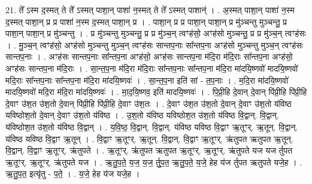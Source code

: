 \documentclass[17pt]{extarticle}
\begin{document}
21. ते᳚ ऽस्म द॒स्मत् ते ते᳚ ऽस्मत् पाशा॒न् पाशा॑ न॒स्मत् ते ते᳚ ऽस्मत् पाशान्॑ । . अ॒स्मत् पाशा॒न् पाशा॑ न॒स्म द॒स्मत् पाशा॒न् प्र प्र पाशा॑ न॒स्म द॒स्मत् पाशा॒न् प्र । . पाशा॒न् प्र प्र पाशा॒न् पाशा॒न् प्र मु॑ञ्चन्तु मुञ्चन्तु॒ प्र पाशा॒न् पाशा॒न् प्र मु॑ञ्चन्तु । . प्र मु॑ञ्चन्तु मुञ्चन्तु॒ प्र प्र मु॑ञ्च॒न् त्वꣳह॑सो॒ अꣳह॑सो मुञ्चन्तु॒ प्र प्र मु॑ञ्च॒न् त्वꣳह॑सः । . मु॒ञ्च॒न् त्वꣳह॑सो॒ अꣳह॑सो मुञ्चन्तु मुञ्च॒न् त्वꣳह॑सः सान्तप॒नाः सा᳚न्तप॒ना अꣳह॑सो मुञ्चन्तु मुञ्च॒न् त्वꣳह॑सः सान्तप॒नाः । . अꣳह॑सः सान्तप॒नाः सा᳚न्तप॒ना अꣳह॑सो॒ अꣳह॑सः सान्तप॒ना म॑दि॒रा म॑दि॒राः सा᳚न्तप॒ना अꣳह॑सो॒ अꣳह॑सः सान्तप॒ना म॑दि॒राः । . सा॒न्त॒प॒ना म॑दि॒रा म॑दि॒राः सा᳚न्तप॒नाः सा᳚न्तप॒ना म॑दि॒रा मा॑दयि॒ष्णवो॑ मादयि॒ष्णवो॑ मदि॒राः सा᳚न्तप॒नाः सा᳚न्तप॒ना म॑दि॒रा मा॑दयि॒ष्णवः॑ । . सा॒न्त॒प॒ना इति॑ सां - त॒प॒नाः । . म॒दि॒रा मा॑दयि॒ष्णवो॑ मादयि॒ष्णवो॑ मदि॒रा म॑दि॒रा मा॑दयि॒ष्णवः॑ । . मा॒द॒यि॒ष्णव॒ इति॑ मादयि॒ष्णवः॑ । . पि॒प्री॒हि दे॒वान् दे॒वान् पि॑प्री॒हि पि॑प्री॒हि दे॒वाꣳ उ॑श॒त उ॑श॒तो दे॒वान् पि॑प्री॒हि पि॑प्री॒हि दे॒वाꣳ उ॑श॒तः । . दे॒वाꣳ उ॑श॒त उ॑श॒तो दे॒वान् दे॒वाꣳ उ॑श॒तो य॑विष्ठ यविष्ठोश॒तो दे॒वान् दे॒वाꣳ उ॑श॒तो य॑विष्ठ । . उ॒श॒तो य॑विष्ठ यविष्ठोश॒त उ॑श॒तो य॑विष्ठ वि॒द्वान्. वि॒द्वान्. य॑विष्ठोश॒त उ॑श॒तो य॑विष्ठ वि॒द्वान् । . य॒वि॒ष्ठ॒ वि॒द्वान्. वि॒द्वान्. य॑विष्ठ यविष्ठ वि॒द्वाꣳ ऋ॒तूꣳर्. ऋ॒तून्. वि॒द्वान्. य॑विष्ठ यविष्ठ वि॒द्वाꣳ ऋ॒तून् । . वि॒द्वाꣳ ऋ॒तूꣳर्. ऋ॒तून्. वि॒द्वान्. वि॒द्वाꣳ ऋ॒तूꣳर्. ऋ॑तुपत ऋतुपत ऋ॒तून्. वि॒द्वान्. वि॒द्वाꣳ ऋ॒तूꣳर्. ऋ॑तुपते । . ऋ॒तूꣳर्. ऋ॑तुपत ऋतुपत ऋ॒तूꣳर्. ऋ॒तूꣳर्. ऋ॑तुपते यज यज र्तुपत ऋ॒तूꣳर्. ऋ॒तूꣳर्. ऋ॑तुपते यज । . ऋ॒तु॒प॒ते॒ य॒ज॒ य॒ज॒ र्तु॒प॒त॒ ऋ॒तु॒प॒ते॒ य॒जे॒ हेह य॑ज र्तुपत ऋतुपते यजे॒ह । . ऋ॒तु॒प॒त॒ इत्यृ॑तु - प॒ते॒ । . य॒जे॒ हेह य॑ज यजे॒ह । \newline
\end{document}

